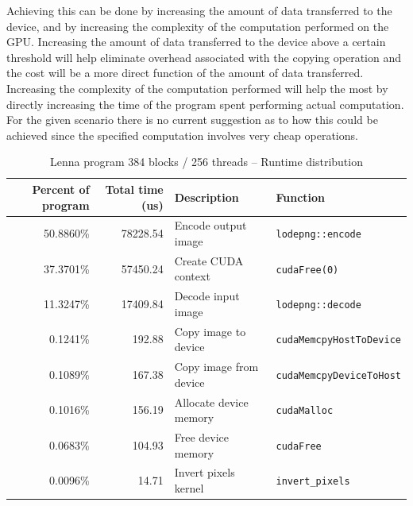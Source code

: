 \begin{enumerate}
Achieving this can be done by increasing the amount of data transferred to the device, and by increasing the complexity of the computation performed on the \ac{GPU}. Increasing the amount of data transferred to the device above a certain threshold will help eliminate overhead associated with the copying operation and the cost will be a more direct function of the amount of data transferred. Increasing the complexity of the computation performed will help the most by directly increasing the time of the program spent performing actual computation. For the given scenario there is no current suggestion as to how this could be achieved since the specified computation involves very cheap operations.

\begin{table}
\begin{tabular}{rrll}
Percent of program & Total time (us) & Description            & Function \\
\hline
50.8860\%          &  78228.54       & Encode output image    & \texttt{lodepng::encode} \\
37.3701\%          &  57450.24       & Create CUDA context    & \texttt{cudaFree(0)} \\
11.3247\%          &  17409.84       & Decode input image     & \texttt{lodepng::decode} \\
 0.1241\%          &    192.88       & Copy image to device   & \texttt{cudaMemcpyHostToDevice} \\
 0.1089\%          &    167.38       & Copy image from device & \texttt{cudaMemcpyDeviceToHost} \\
 0.1016\%          &    156.19       & Allocate device memory & \texttt{cudaMalloc} \\
 0.0683\%          &    104.93       & Free device memory     & \texttt{cudaFree} \\
 0.0096\%          &     14.71       & Invert pixels kernel   & \texttt{invert\_pixels} \\
\end{tabular}
\caption{Lenna program 384 blocks / 256 threads -- Runtime distribution}
\label{table:lenna_runtime_distribution}
\end{table}


\end{enumerate}
